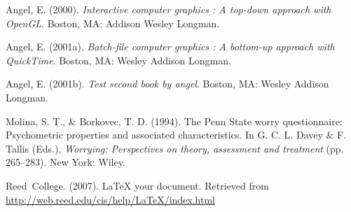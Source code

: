 \documentclass [11pt, proquest] {uwthesis}[2015/03/03]
\newlength{\cslhangindent}
\newenvironment{CSLReferences}%
{\setlength{\parindent}{0pt}%
\everypar{\setlength{\hangindent}{\cslhangindent}}\ignorespaces}%
{\par}
\begin{document}
\hypertarget{refs}{}
\begin{CSLReferences}{1}{0}
\leavevmode{}%
Angel, E. (2000). \emph{Interactive computer graphics : A top-down approach with OpenGL}. Boston, MA: Addison Wesley Longman.

\leavevmode{}%
Angel, E. (2001a). \emph{Batch-file computer graphics : A bottom-up approach with QuickTime}. Boston, MA: Wesley Addison Longman.

\leavevmode{}%
Angel, E. (2001b). \emph{Test second book by angel}. Boston, MA: Wesley Addison Longman.

\leavevmode{}%
Molina, S. T., \& Borkovec, T. D. (1994). The {P}enn {S}tate worry questionnaire: Psychometric properties and associated characteristics. In G. C. L. Davey \& F. Tallis (Eds.), \emph{Worrying: Perspectives on theory, assessment and treatment} (pp. 265--283). New York: Wiley.

\leavevmode{}%
Reed~College. (2007). LaTeX your document. Retrieved from \url{http://web.reed.edu/cis/help/LaTeX/index.html}

\end{CSLReferences}
\end{document}
